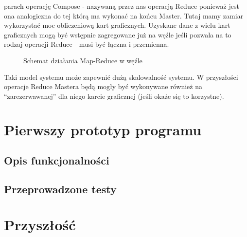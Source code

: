 \documentclass[paper=a4, fontsize=11pt]{scrartcl} %
\numberwithin{equation}{section} %
\numberwithin{figure}{section} %
\numberwithin{table}{section} %
\begin{document}
\begin{itemize}
		parach operację Compose - nazywaną przez nas operacją Reduce ponieważ jest ona analogiczna do tej którą ma wykonać na końcu Master. Tutaj mamy zamiar wykorzystać
		moc obliczeniową kart graficznych. Uzyskane dane z wielu kart graficznych mogą być wstępnie zagregowane już na węźle jeśli pozwala na to rodzaj operacji Reduce - musi być łączna i przemienna.
		\begin{figure}[t]
			\begin{center}
				\caption{Schemat działania Map-Reduce w węźle}
			\end{center}
		\end{figure}
\end{itemize}
\clearpage

Taki model systemu może zapewnić dużą skalowalność systemu. W przyszłości operacje Reduce Mastera będą mogły być wykonywane również na ``zarezerwawanej'' dla niego 
karcie graficznej (jeśli okaże się to korzystne).

\section{Pierwszy prototyp programu}
	\subsection{Opis funkcjonalności}
	\subsection{Przeprowadzone testy}

\section{Przyszłość}
\end{document}
